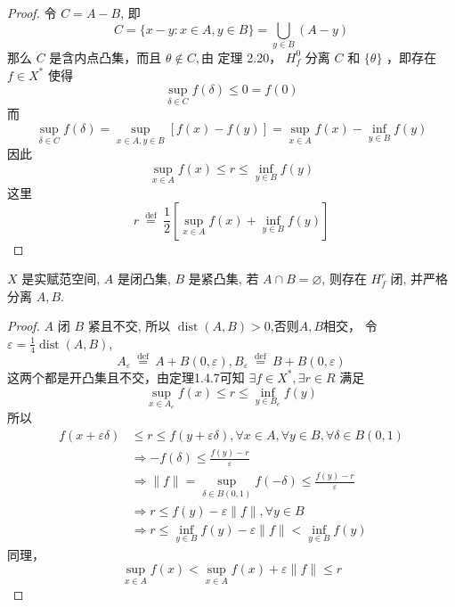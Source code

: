 \documentclass[lang=cn,newtx,10pt,scheme=chinese,thmcnt=chapter]{elegantbook}
\begin{document}
\begin{proof}
令 $C=A-B$, 即
\begin{equation*}
C=\{x-y: x \in A, y \in B\}=\bigcup_{y \in B}(A-y)
\end{equation*}
那么 $C$ 是含内点凸集，而且 $\theta\notin C, 由$ 定理 2.20， $H_f^0$ 分离 $C$ 和 $\{\theta\}$ ，即存在 $f \in X^*$ 使得
\begin{equation*}
\sup _{\delta \in C} f(\delta) \leqslant 0=f(0)
\end{equation*}
而
\begin{equation*}
\sup _{\delta \in C} f(\delta)=\sup _{x \in A, y \in B}[f(x)-f(y)]=\sup _{x \in A} f(x)-\inf _{y \in B} f(y)
\end{equation*}
因此
\begin{equation*}
\sup _{x \in A} f(x) \leqslant r \leqslant \inf _{y \in B} f(y)
\end{equation*}
这里
\begin{equation*}
r \stackrel{\text { def }}{=} \frac{1}{2}\left[\sup _{x \in A} f(x)+\inf _{y \in B} f(y)\right]
\end{equation*}
\end{proof}
\begin{theorem}
$X$ 是实赋范空间, $A$ 是闭凸集, $B$ 是紧凸集, 若 $A \cap B=\varnothing$, 则存在 $H_f^r$ 闭, 并严格分离 $A, B$.
\end{theorem}
\begin{proof}
 $A$ 闭 $B$ 紧且不交, 所以 $\operatorname{dist}(A, B)>0$,否则$A,B$相交， 令 $\varepsilon=\frac{1}{4} \operatorname{dist}(A, B)$,
\begin{equation*}
A_{\varepsilon} \stackrel{\text { def }}{=} A+B(0, \varepsilon), B_{\varepsilon} \stackrel{\text { def }}{=} B+B(0, \varepsilon)
\end{equation*}
这两个都是开凸集且不交，由定理1.4.7可知 $\exists f \in X^*, \exists r \in R$ 满足
\begin{equation*}
\sup _{x \in A_e} f(x) \leqslant r \leqslant \inf _{y \in B_e} f(y)
\end{equation*}
所以
\begin{equation*}
\begin{aligned}
f(x+\varepsilon \delta) & \leqslant r \leqslant f(y+\varepsilon \delta), \forall x \in A, \forall y \in B, \forall \delta \in B(0,1) \\
& \Rightarrow-f(\delta) \leqslant \frac{f(y)-r}{\varepsilon} \\
& \Rightarrow\|f\|=\sup _{\delta \in B(0,1)} f(-\delta) \leqslant \frac{f(y)-r}{\varepsilon} \\
& \Rightarrow r \leqslant f(y)-\varepsilon\|f\|, \forall y \in B \\
& \Rightarrow r \leqslant \inf _{y \in B} f(y)-\varepsilon\|f\|<\inf _{y \in B} f(y)
\end{aligned}
\end{equation*}
同理，
\begin{equation*}
\sup _{x \in A} f(x)<\sup _{x \in A} f(x)+\varepsilon\|f\| \leqslant r
\end{equation*}
\end{proof}
\end{document}
